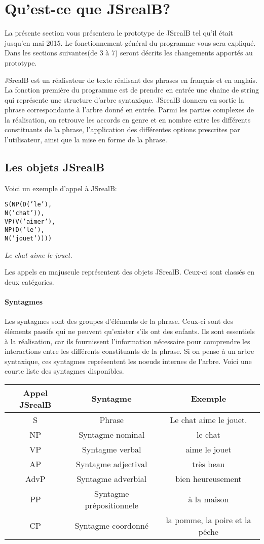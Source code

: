 \documentclass[11pt]{article} %
\newcommand{\real}[1]{\emph{#1}}
\begin{document}
\section{Qu'est-ce que JSrealB?}

La présente section vous présentera le prototype de JSrealB tel qu'il
était jusqu'en mai 2015. Le fonctionnement général du programme vous
sera expliqué. Dans les sections suivantes(de 3 à 7) seront décrits
les changements apportés au prototype.

JSrealB est un réalisateur de texte réalisant des phrases en français
et en anglais. La fonction première du programme est de prendre en
entrée une chaine de string qui représente une structure d'arbre syntaxique.
JSrealB donnera en sortie la phrase correspondante à l'arbre donné
en entrée. Parmi les parties complexes de la réalisation, on retrouve
les accords en genre et en nombre entre les différents constituants
de la phrase, l'application des différentes options prescrites par
l'utilisateur, ainsi que la mise en forme de la phrase. 

\subsection{Les objets JSrealB}

Voici un exemple d'appel à JSrealB: \newline

\begin{alltt}
S(NP(D('le'),
     N('chat')),
  VP(V('aimer'),
     NP(D('le'),
        N('jouet'))))
\end{alltt}
\real{Le chat aime le jouet.}


Les appels en majuscule représentent des objets JSrealB. Ceux-ci sont
classés en deux catégories. 

\paragraph{Syntagmes}

Les syntagmes sont des groupes d'éléments de la phrase. Ceux-ci sont
des éléments passifs qui ne peuvent qu'exister s'ils ont des enfants.
Ils sont essentiels à la réalisation, car ils fournissent l'information
nécessaire pour comprendre les interactions entre les différents constituants
de la phrase. Si on pense à un arbre syntaxique, ces syntagmes représentent
les noeuds internes de l'arbre. Voici une courte liste des syntagmes
disponibles.

\begin{tabular}{|c|c|c|}
\hline 
Appel JSrealB & Syntagme & Exemple\tabularnewline
\hline 
\hline 
S & Phrase & Le chat aime le jouet.\tabularnewline
\hline 
NP & Syntagme nominal & le chat\tabularnewline
\hline 
VP & Syntagme verbal & aime le jouet\tabularnewline
\hline 
AP & Syntagme adjectival & très beau\tabularnewline
\hline 
AdvP & Syntagme adverbial & bien heureusement\tabularnewline
\hline 
PP & Syntagme prépositionnele & à la maison\tabularnewline
\hline 
CP & Syntagme coordonné & la pomme, la poire et la pêche\tabularnewline
\hline 
\end{tabular}
\end{document}
